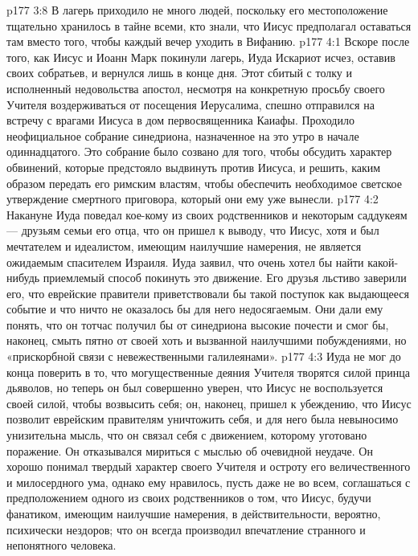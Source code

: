 \vs p177 3:8 \pc В лагерь приходило не много людей, поскольку его местоположение тщательно хранилось в тайне всеми, кто знали, что Иисус предполагал оставаться там вместо того, чтобы каждый вечер уходить в Вифанию.
\vs p177 4:1 Вскоре после того, как Иисус и Иоанн Марк покинули лагерь, Иуда Искариот исчез, оставив своих собратьев, и вернулся лишь в конце дня. Этот сбитый с толку и исполненный недовольства апостол, несмотря на конкретную просьбу своего Учителя воздерживаться от посещения Иерусалима, спешно отправился на встречу с врагами Иисуса в дом первосвященника Каиафы. Проходило неофициальное собрание синедриона, назначенное на это утро в начале одиннадцатого. Это собрание было созвано для того, чтобы обсудить характер обвинений, которые предстояло выдвинуть против Иисуса, и решить, каким образом передать его римским властям, чтобы обеспечить необходимое светское утверждение смертного приговора, который они ему уже вынесли.
\vs p177 4:2 Накануне Иуда поведал кое\hyp{}кому из своих родственников и некоторым саддукеям --- друзьям семьи его отца, что он пришел к выводу, что Иисус, хотя и был мечтателем и идеалистом, имеющим наилучшие намерения, не является ожидаемым спасителем Израиля. Иуда заявил, что очень хотел бы найти какой\hyp{}нибудь приемлемый способ покинуть это движение. Его друзья льстиво заверили его, что еврейские правители приветствовали бы такой поступок как выдающееся событие и что ничто не оказалось бы для него недосягаемым. Они дали ему понять, что он тотчас получил бы от синедриона высокие почести и смог бы, наконец, смыть пятно от своей хоть и вызванной наилучшими побуждениями, но «прискорбной связи с невежественными галилеянами».
\vs p177 4:3 Иуда не мог до конца поверить в то, что могущественные деяния Учителя творятся силой принца дьяволов, но теперь он был совершенно уверен, что Иисус не воспользуется своей силой, чтобы возвысить себя; он, наконец, пришел к убеждению, что Иисус позволит еврейским правителям уничтожить себя, и для него была невыносимо унизительна мысль, что он связал себя с движением, которому уготовано поражение. Он отказывался мириться с мыслью об очевидной неудаче. Он хорошо понимал твердый характер своего Учителя и остроту его величественного и милосердного ума, однако ему нравилось, пусть даже не во всем, соглашаться с предположением одного из своих родственников о том, что Иисус, будучи фанатиком, имеющим наилучшие намерения, в действительности, вероятно, психически нездоров; что он всегда производил впечатление странного и непонятного человека.
